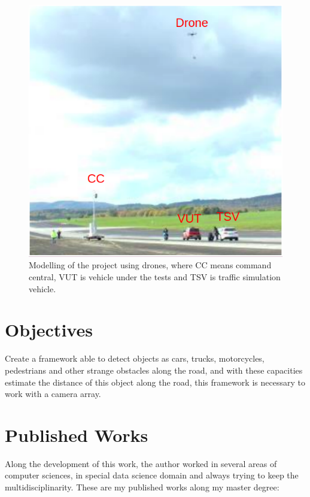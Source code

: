 \begin{figure}[H]
\centering
\includegraphics[scale=0.5]{imagens/proposal.png}
\caption{Modelling of the project using drones, where CC means command central, VUT is vehicle under the tests and TSV is traffic simulation vehicle.}
\label{fig:tests}
\end{figure}

\section{Objectives}

Create a framework able to detect objects as cars, trucks, motorcycles, pedestrians and other strange obstacles along the road, and with these capacities estimate the distance of this object along the road, this framework is necessary to work with a camera array.

\section{Published Works}

Along the development of this work, the author worked in several areas of computer sciences, in special data science domain and always trying to keep the 
multidisciplinarity. These are my published works along my master degree:

